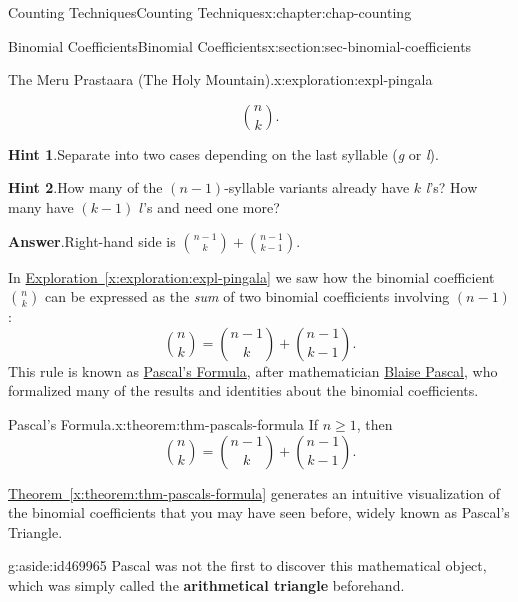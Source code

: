 \documentclass[oneside,10pt,]{book}
\newcommand{\blocktitlefont}{\relax}
\newcommand{\xreffont}{\relax}
\newcommand{\terminology}[1]{\textbf{#1}}
\numberwithin{equation}{section}
\begin{document}
\begin{chapterptx}{Counting Techniques}{}{Counting Techniques}{}{}{x:chapter:chap-counting}
\begin{sectionptx}{Binomial Coefficients}{}{Binomial Coefficients}{}{}{x:section:sec-binomial-coefficients}
\begin{exploration}{The Meru Prastaara (The Holy Mountain).}{x:exploration:expl-pingala}
\begin{enumerate}[font=\bfseries,label=(\alph*),ref=\alph*]
\begin{equation*}
\binom{n}{k}\text{.}
\end{equation*}
%
\par\smallskip%
\noindent\textbf{\blocktitlefont Hint 1}.\hypertarget{g:hint:id469906}{}\quad{}Separate into two cases depending on the last syllable (\emph{g} or \emph{l}).%
\par\smallskip%
\noindent\textbf{\blocktitlefont Hint 2}.\hypertarget{g:hint:id469879}{}\quad{}How many of the \((n-1)\)-syllable variants already have \(k\) \emph{l}'s? How many have \((k-1)\) \(l\)'s and need one more?%
\par\smallskip%
\noindent\textbf{\blocktitlefont Answer}.\hypertarget{g:answer:id469926}{}\quad{}Right-hand side is \(\displaystyle\binom{n-1}{k} + \binom{n-1}{k-1}\).%
\end{enumerate}
\end{exploration}
In \hyperref[x:exploration:expl-pingala]{Exploration~{\xreffont\ref{x:exploration:expl-pingala}}} we saw how the binomial coefficient \(\displaystyle\binom{n}{k}\) can be expressed as the \emph{sum} of two binomial coefficients involving \((n-1)\):%
\begin{equation*}
\binom{n}{k} = \binom{n-1}{k} + \binom{n-1}{k-1}\text{.}
\end{equation*}
This rule is known as \href{https://en.wikipedia.org/wiki/Pascal\%27s_rule}{Pascal's Formula}, after mathematician \href{https://en.wikipedia.org/wiki/Blaise_Pascal}{Blaise Pascal}, who formalized many of the results and identities about the binomial coefficients.%
\begin{theorem}{Pascal's Formula.}{}{x:theorem:thm-pascals-formula}%
If \(n \geq 1\), then%
\begin{equation*}
\binom{n}{k} = \binom{n-1}{k} + \binom{n-1}{k-1}\text{.}
\end{equation*}
%
\end{theorem}
\hyperref[x:theorem:thm-pascals-formula]{Theorem~{\xreffont\ref{x:theorem:thm-pascals-formula}}} generates an intuitive visualization of the binomial coefficients that you may have seen before, widely known as Pascal's Triangle.%
\begin{aside}{}{g:aside:id469965}%
Pascal was not the first to discover this mathematical object, which was simply called the \terminology{arithmetical triangle} beforehand.%
\par

\end{aside}
\end{sectionptx}
\end{chapterptx}
\end{document}
